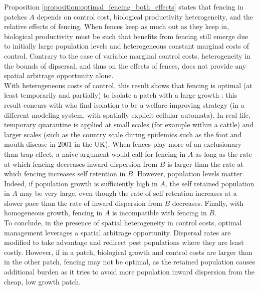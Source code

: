 Proposition \ref{proposition:optimal_fencing_both_effects} states that fencing in patches $A$ depends on control cost, biological productivity heterogeneity, and the relative effects of fencing. When fences keep as much out as they keep in, biological productivity must be such that benefits from fencing still emerge due to initially large population levels and heterogeneous constant marginal costs of control. Contrary to the case of variable marginal control costs, heterogeneity in the bounds of dipsersal, and thus on the effects of fences, does not provide any spatial arbitrage opportunity alone. \\
With heterogeneous costs of control, this result shows that fencing is optimal (at least temporarily and partially) to isolate a patch with a large growth : this result concurs with \cite{Wilen2012} who find isolation to be a welfare improving strategy (in a different modeling system, with spatially explicit cellular automata). In real life, temporary quarantine is applied at small scales (for example within a cattle) and larger scales (such as the country scale during epidemics such as the foot and mouth disease in 2001 in the UK).  When fences play more of an exclusionary than trap effect, a naive argument would call for fencing in $A$ as long as the rate at which fencing decreases inward dispersion from $B$ is larger than the rate at which fencing increases self retention in $B$. However, population levels matter. Indeed, if population growth is sufficiently high in $A$, the self retained population in $A$ may be very large, even though the rate of self retention increases at a slower pace than the rate of inward dispersion from $B$ decreases.  Finally, with homogeneous growth, fencing in $A$ is incompatible with fencing in $B$.\\

To conclude, in the presence of spatial heterogeneity in control costs, optimal management leverages a spatial arbitrage opportunity. Dispersal rates are modified to take advantage and redirect pest populations where they are least costly. However, if in a patch, biological growth and control costs are larger than in the other patch, fencing may not be optimal, as the retained population causes additional burden as it tries to avoid more population inward dispersion from the cheap, low growth patch.


